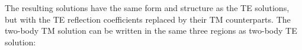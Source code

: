 
The resulting solutions have the same form and structure as the TE solutions, but with 
the TE reflection coefficients replaced by their TM counterparts.  
The two-body TM solution can be written in the same three regions as two-body TE solution:%

